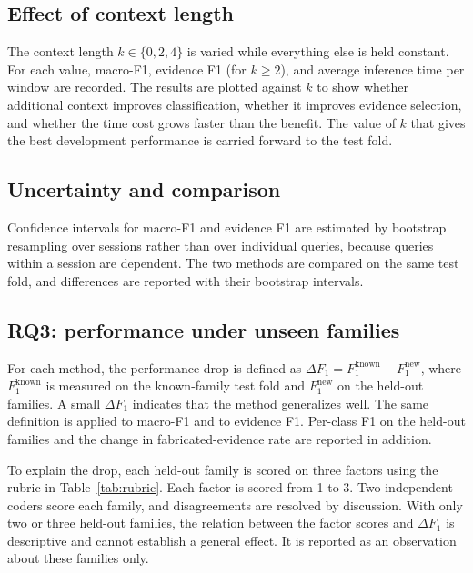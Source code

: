 \documentclass[12pt,a4paper]{report}
\begin{document}
\subsection{Effect of context length}
The context length $k \in \{0, 2, 4\}$ is varied while everything else is held constant. For each value, macro-F1, evidence F1 (for $k \geq 2$), and average inference time per window are recorded. The results are plotted against $k$ to show whether additional context improves classification, whether it improves evidence selection, and whether the time cost grows faster than the benefit. The value of $k$ that gives the best development performance is carried forward to the test fold.

\subsection{Uncertainty and comparison}
Confidence intervals for macro-F1 and evidence F1 are estimated by bootstrap resampling over sessions rather than over individual queries, because queries within a session are dependent. The two methods are compared on the same test fold, and differences are reported with their bootstrap intervals.

\subsection{RQ3: performance under unseen families}
For each method, the performance drop is defined as $\Delta F_1 = F_1^{\text{known}} - F_1^{\text{new}}$, where $F_1^{\text{known}}$ is measured on the known-family test fold and $F_1^{\text{new}}$ on the held-out families. A small $\Delta F_1$ indicates that the method generalizes well. The same definition is applied to macro-F1 and to evidence F1. Per-class F1 on the held-out families and the change in fabricated-evidence rate are reported in addition.

To explain the drop, each held-out family is scored on three factors using the rubric in Table~\ref{tab:rubric}. Each factor is scored from 1 to 3. Two independent coders score each family, and disagreements are resolved by discussion. With only two or three held-out families, the relation between the factor scores and $\Delta F_1$ is descriptive and cannot establish a general effect. It is reported as an observation about these families only.
\end{document}
